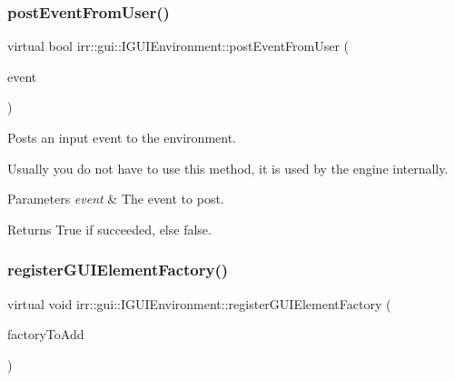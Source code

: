 \subsubsection{\texorpdfstring{post\+Event\+From\+User()}{postEventFromUser()}\hspace{0.1cm}{\footnotesize\ttfamily [2/2]}}
{\footnotesize\ttfamily virtual bool irr\+::gui\+::\+I\+G\+U\+I\+Environment\+::post\+Event\+From\+User (\begin{DoxyParamCaption}\item[{const \hyperlink{structirr_1_1SEvent}{S\+Event} \&}]{event }\end{DoxyParamCaption})\hspace{0.3cm}{\ttfamily [pure virtual]}}



Posts an input event to the environment. 

Usually you do not have to use this method, it is used by the engine internally. 
\begin{DoxyParams}{Parameters}
{\em event} & The event to post. \\
\hline
\end{DoxyParams}
\begin{DoxyReturn}{Returns}
True if succeeded, else false. 
\end{DoxyReturn}
\mbox{\label{classirr_1_1gui_1_1IGUIEnvironment_a653ac2cc8640899c23f4d55d9a5f0fdd}} 
\subsubsection{\texorpdfstring{register\+G\+U\+I\+Element\+Factory()}{registerGUIElementFactory()}\hspace{0.1cm}{\footnotesize\ttfamily [1/2]}}
{\footnotesize\ttfamily virtual void irr\+::gui\+::\+I\+G\+U\+I\+Environment\+::register\+G\+U\+I\+Element\+Factory (\begin{DoxyParamCaption}\item[{\hyperlink{classirr_1_1gui_1_1IGUIElementFactory}{I\+G\+U\+I\+Element\+Factory} $\ast$}]{factory\+To\+Add }\end{DoxyParamCaption})\hspace{0.3cm}{\ttfamily [pure virtual]}}



